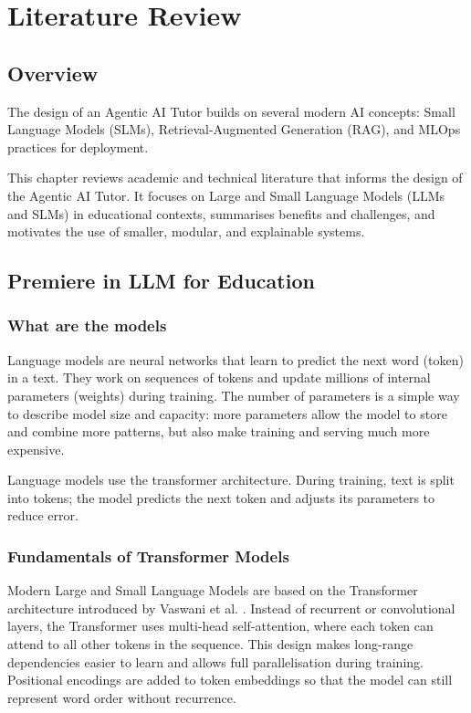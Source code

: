 \chapter{Literature Review}
\label{chap:literature_review}

\section{Overview}
The design of an Agentic AI Tutor builds on several modern AI concepts: Small Language Models (SLMs), Retrieval-Augmented Generation (RAG), and MLOps practices for deployment.

This chapter reviews academic and technical literature that informs the design of the Agentic AI Tutor. It focuses on Large and Small Language Models (LLMs and SLMs) in educational contexts, summarises benefits and challenges, and motivates the use of smaller, modular, and explainable systems.

\section{Premiere in LLM for Education}

\subsection{What are the models}
Language models are neural networks that learn to predict the next word (token) in a text. They work on sequences of tokens and update millions of internal parameters (weights) during training. The number of parameters is a simple way to describe model size and capacity: more parameters allow the model to store and combine more patterns, but also make training and serving much more expensive.

Language models use the transformer architecture. During training, text is split into tokens; the model predicts the next token and adjusts its parameters to reduce error.

\subsection{Fundamentals of Transformer Models}
Modern Large and Small Language Models are based on the Transformer architecture introduced by Vaswani et al. \parencite{Untitled54:online}. Instead of recurrent or convolutional layers, the Transformer uses multi-head self-attention, where each token can attend to all other tokens in the sequence. This design makes long-range dependencies easier to learn and allows full parallelisation during training. Positional encodings are added to token embeddings so that the model can still represent word order without recurrence.

